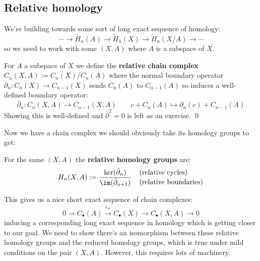 \documentclass[a4paper]{article}
\begin{document}
\subsection{Relative homology}

We're building towards some sort of long exact sequence of homology:\[
    \cdots \rightarrow \tilde{H}_n(A)\rightarrow \tilde{H}_n(X)\rightarrow \tilde{H}_n(X/A)\rightarrow \cdots
\]
so we need to work with some $(X,A)$ where $A$ is a subspace of $X$.

\begin{definition}
    For $A$ a subspace of $X$ we define the \textbf{relative chain complex} $C_n(X,A):= C_n(X)/C_n(A)$ where the normal boundary operator $\partial_n:C_n(X)\rightarrow C_{n-1}(X)$ sends $C_n(A)$ to $C_{n-1}(A)$ so induces a well-defined boundary operator: \[
        \bar{\partial}_n:C_n(X,A)\rightarrow C_{n-1}(X,A) \qquad c + C_n(A) \mapsto \partial_n(c) + C_{n-1}(A)
    \]
    Showing this is well-defined and $\bar{\partial}^2=0$ is left as an exercise. \qed
\end{definition}
Now we have a chain complex we should obviously take its homology groups to get:

\begin{definition}
    For the same $(X,A)$ the \textbf{relative homology groups} are: \[
    H_n(X,A) := \frac{\ker(\bar{\partial}_n)}{\im(\bar{\partial}_{n+1})} \quad
    \genfrac{}{}{0pt}{}{\text{(relative cycles)\hspace{22pt}}}{\text{(relative boundaries)}}
    \]
\end{definition}

\begin{exercise}
\end{exercise}
This gives us a nice short exact sequence of chain complexes: \[
    0\rightarrow C_\bullet(A)\xrightarrow{i_\#} C_\bullet(X) \rightarrow C_\bullet(X,A)\rightarrow 0
\]
inducing a corresponding long exact sequence in homology which is getting closer to our goal. We need to show there's an isomorphism between these relative homology groups and the reduced homology groups, which is true under mild conditions on the pair $(X,A)$. However, this requires lots of machinery.
\end{document}
